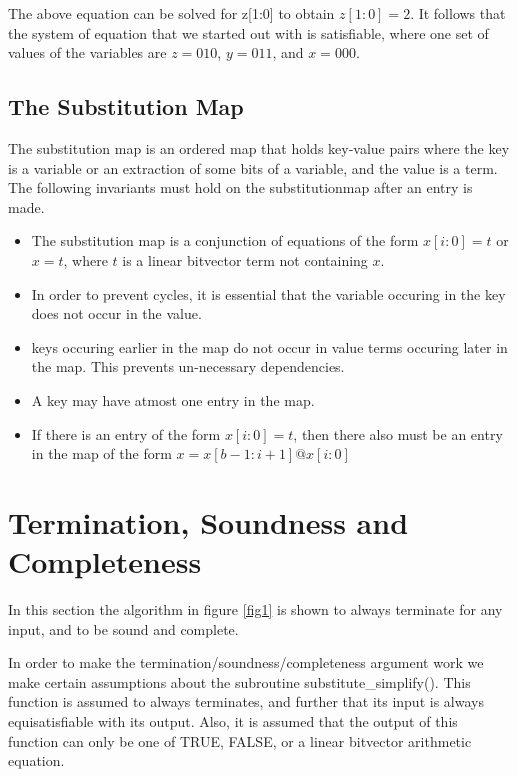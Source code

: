 The above equation can be solved for z[1:0] to obtain $z[1:0] = 2$. It
follows that the system of equation that we started out with is
satisfiable, where one set of values of the variables are $z=010$, $y
= 011$, and $x=000$.

\subsection{The Substitution Map}
The substitution map is an ordered map that holds key-value pairs
where the key is a variable or an extraction of some bits of a
variable, and the value is a term. The following invariants must hold
on the substitutionmap after an entry is made.

\begin{itemize}
\item The substitution map is a conjunction of equations of the form
$x[i:0] = t$ or $x=t$, where $t$ is a linear bitvector term not
containing $x$.

\item In order to prevent cycles, it is essential that the variable
occuring in the key does not occur in the value.

\item keys occuring earlier in the map do not occur in value terms
occuring later in the map. This prevents un-necessary dependencies.

\item A key may have atmost one entry in the map.

\item If there is an entry of the form $x[i:0] = t$, then there also
must be an entry in the map of the form $x=x[b-1:i+1]@x[i:0]$
\end{itemize}

\section{Termination, Soundness and Completeness}
In this section the algorithm in figure \ref{fig1} is shown to always
terminate for any input, and to be sound and complete. 

In order to make the termination/soundness/completeness argument work
we make certain assumptions about the subroutine
substitute\_simplify(). This function is assumed to always terminates,
and further that its input is always equisatisfiable with its
output. Also, it is assumed that the output of this function can only
be one of TRUE, FALSE, or a linear bitvector arithmetic equation.

